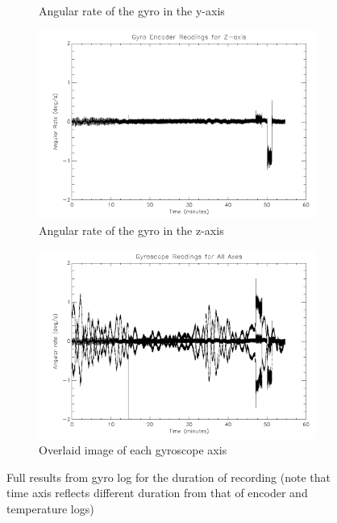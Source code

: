 {\begin{figure}[htbp]
\begin{subfigure}{0.45\textwidth}
		\caption{Angular rate of the gyro in the y-axis}
		\label{fig:sub:gyroy}
	\end{subfigure}
	\begin{subfigure}{0.45\textwidth}
		\includegraphics[width=1\linewidth]{appendix/img/campaign_results/gyroz.png}
		\caption{Angular rate of the gyro in the z-axis}
		\label{fig:sub:gyroz}
	\end{subfigure}
	\begin{subfigure}{0.45\textwidth}
		\includegraphics[width=1\linewidth]{appendix/img/campaign_results/gyroall.png}
		\caption{Overlaid image of each gyroscope axis}
		\label{fig:sub:gyroall}
	\end{subfigure}
	\caption{Full results from gyro log for the duration of recording (note that time axis reflects different duration from that of encoder and temperature logs)}
	\label{fig:gyro}
\end{figure}

}
